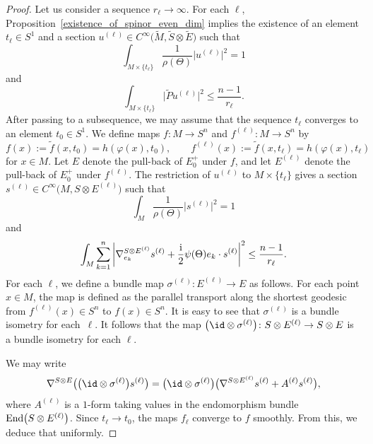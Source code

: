 \begin{proof}
Let us consider a sequence $r_\ell \to \infty$. For each $\ell$, Proposition~\ref{existence_of_spinor_even_dim} implies the existence of an element $t_\ell \in S^1$ and a section $u^{(\ell)} \in C^\infty\big(\tilde{M},\tilde{S} \otimes \tilde{E}\big)$ such that
\[
 \int_{M \times \{t_\ell\}} \frac{1}{\rho(\Theta)}\big|u^{(\ell)}\big|^2 = 1
\]
and
\[\int_{M \times \{t_\ell\}} \big|\tilde{P} u^{(\ell)}\big|^2 \leq \frac{n-1}{r_\ell}.
\]
After passing to a subsequence, we may assume that the sequence $t_\ell$ converges to an element $t_0 \in S^1$. We define maps $f\colon M \to S^n$ and $f^{(\ell)}\colon M \to S^n$ by
\[
 f(x) := \tilde{f}(x,t_0) = h(\varphi(x),t_0), \qquad f^{(\ell)}(x) := \tilde{f}(x,t_\ell) = h(\varphi(x) ,t_\ell)
\]
for $x \in M$.
Let $E$ denote the pull-back of $E_0^+$ under $f$, and let $E^{(\ell)}$ denote the pull-back of $E_0^+$ under $f^{(\ell)}$.
The restriction of $u^{(\ell)}$ to $M \times \{t_\ell\}$ gives a section $s^{(\ell)} \in C^\infty\big(M,S \otimes E^{(\ell)}\big)$ such that
\[
 \int_M \frac{1}{\rho(\Theta)}\big|s^{(\ell)}\big|^2 = 1
 \]
and
\begin{equation}
 \int_M \sum_{k=1}^n \left| \nabla_{e_k}^{S \otimes E^{(\ell)}} s^{(\ell)} + \frac{\rm i}{2} \psi(\Theta) e_k \cdot s^{(\ell)} \right|^2 \leq \frac{n-1}{r_\ell}.
\label{eq:almostflat}
\end{equation}
For each $\ell$, we define a bundle map $\sigma^{(\ell)}\colon E^{(\ell)} \to E$ as follows.
For each point $x \in M$, the map  is defined as the parallel transport along the shortest geodesic from $f^{(\ell)}(x) \in S^n$ to $f(x) \in S^n$.
It is easy to see that $\sigma^{(\ell)}$ is a bundle isometry for each~$\ell$. It follows that the map $\big(\id \otimes \sigma^{(\ell)}\big)\colon S \otimes E^{(\ell)} \to S \otimes E$ is a bundle isometry for each $\ell$.

We may write
\begin{equation}
\label{eq:A_l_term}
\nabla^{S \otimes E}\big(\big(\id \otimes \sigma^{(\ell)}\big) s^{(\ell)}\big) = \big(\id \otimes \sigma^{(\ell)}\big) \big(\nabla^{S \otimes E^{(\ell)}} s^{(\ell)} + A^{(\ell)} s^{(\ell)}\big),
\end{equation}
where $A^{(\ell)}$ is a $1$-form taking values in the endomorphism bundle $\text{\rm End}\big(S \otimes E^{(\ell)}\big)$. Since $t_\ell \to t_0$, the maps $f_\ell$ converge to $f$ smoothly. From this, we deduce that  uniformly.


\end{proof}
